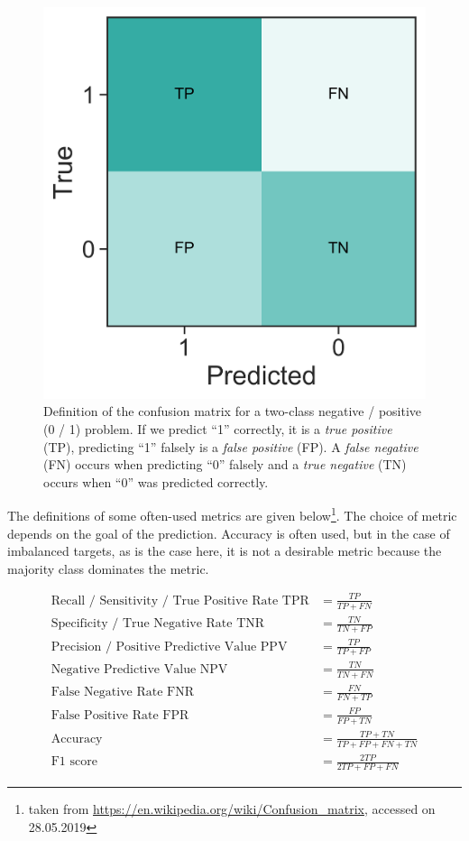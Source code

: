 \documentclass[
  11pt,
  a4paper,
  DIV=12,captions=tableheading,oneside,titlepage=firstiscover,abstracton]{scrreprt}
\begin{document}
\begin{figure}

{\centering \includegraphics[width=0.4\linewidth]{./figures/conf-mat-def-1} 

}

\caption{Definition of the confusion matrix for a two-class negative / positive (0 / 1) problem. If we predict ``1'' correctly, it is a \emph{true positive} (TP), predicting ``1'' falsely is a \emph{false positive} (FP). A \emph{false negative} (FN) occurs when predicting ``0'' falsely and a \emph{true negative} (TN) occurs when ``0'' was predicted correctly.}\label{fig:conf-mat-def}
\end{figure}

The definitions of some often-used metrics are given below\footnote{taken from \url{https://en.wikipedia.org/wiki/Confusion_matrix}, accessed on 28.05.2019}. The choice of metric depends on the goal of the prediction. Accuracy is often used, but in the case of imbalanced targets, as is the case here, it is not a desirable metric because the majority class dominates the metric.

\begin{align*}
\text{Recall / Sensitivity / True Positive Rate TPR} &= \frac{TP}{TP + FN} \\
\text{Specificity / True Negative Rate TNR} &= \frac{TN}{TN+FP} \\ 
\text{Precision / Positive Predictive Value PPV} &= \frac{TP}{TP + FP}\\
\text{Negative Predictive Value NPV} &= \frac{TN}{TN+FN}\\
\text{False Negative Rate FNR} &= \frac{FN}{FN+TP}\\
\text{False Positive Rate FPR} &= \frac{FP}{FP+TN}\\
\text{Accuracy} &= \frac{TP + TN}{TP + FP + FN + TN} \\
\text{F1 score} &= \frac{2TP}{2TP+FP+FN}
\end{align*}
\end{document}
